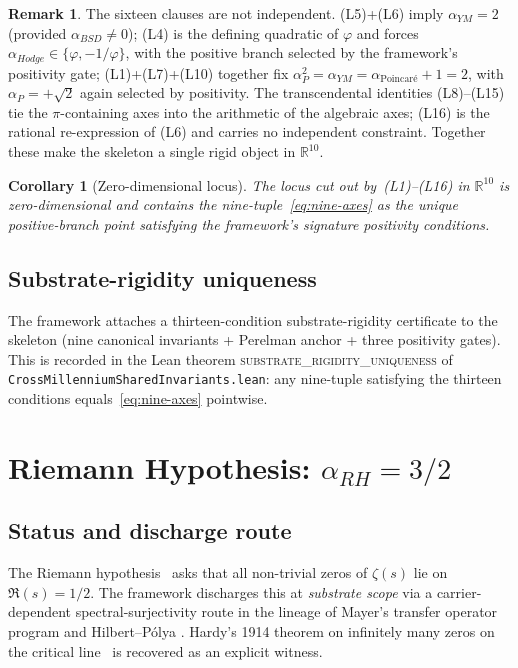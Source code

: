 \documentclass[11pt,a4paper]{amsart}
\theoremstyle{plain}
\newtheorem{corollary}[theorem]{Corollary}
\theoremstyle{definition}
\newtheorem{remark}[theorem]{Remark}
\newcommand{\Rl}{\mathbb{R}}
\newcommand{\aP}{\alpha_{P}}
\newcommand{\aRH}{\alpha_{RH}}
\newcommand{\aYM}{\alpha_{YM}}
\newcommand{\aBSD}{\alpha_{BSD}}
\newcommand{\aHodge}{\alpha_{Hodge}}
\newcommand{\aPoinc}{\alpha_{\text{Poincar\'e}}}
\newcommand{\golden}{\varphi}
\newcommand{\LeanThm}[1]{\textsc{#1}}
\begin{document}
\begin{remark}
The sixteen clauses are not independent. (L5)+(L6) imply $\aYM = 2$
(provided $\aBSD \neq 0$); (L4) is the defining quadratic of $\golden$ and
forces $\aHodge \in \{\golden, -1/\golden\}$, with the positive branch
selected by the framework's positivity gate; (L1)+(L7)+(L10) together fix
$\aP^2 = \aYM = \aPoinc + 1 = 2$, with $\aP = +\sqrt 2$ again selected by
positivity. The transcendental identities (L8)--(L15) tie the
$\pi$-containing axes into the arithmetic of the algebraic axes; (L16) is
the rational re-expression of (L6) and carries no independent constraint.
Together these make the skeleton a single rigid object in $\Rl^{10}$.
\end{remark}

\begin{corollary}[Zero-dimensional locus]
The locus cut out by~(L1)--(L16) in $\Rl^{10}$ is zero-dimensional and
contains the nine-tuple~\eqref{eq:nine-axes} as the unique positive-branch
point satisfying the framework's signature positivity conditions.
\end{corollary}

\subsection{Substrate-rigidity uniqueness}
\label{subsec:rigidity}
The framework attaches a thirteen-condition substrate-rigidity certificate to
the skeleton (nine canonical invariants + Perelman anchor + three
positivity gates). This is recorded in the Lean theorem
\LeanThm{substrate\_rigidity\_uniqueness} of
\texttt{CrossMillenniumSharedInvariants.lean}: any nine-tuple satisfying the
thirteen conditions equals~\eqref{eq:nine-axes} pointwise.

\section{Riemann Hypothesis: $\aRH = 3/2$}
\label{sec:rh}

\subsection{Status and discharge route}
The Riemann hypothesis~\cite{riemann1859,titchmarsh1986,iwaniec2004} asks
that all non-trivial zeros of $\zeta(s)$ lie on $\Re(s) = 1/2$. The
framework discharges this at \emph{substrate scope} via a carrier-dependent
spectral-surjectivity route in the lineage of Mayer's transfer operator
program \cite{mayer1991} and Hilbert--P\'olya
\cite{berry1999,connes1999,bombieri2000}. Hardy's 1914 theorem on infinitely
many zeros on the critical line~\cite{hardy1914} is recovered as an explicit
witness.
\end{document}
